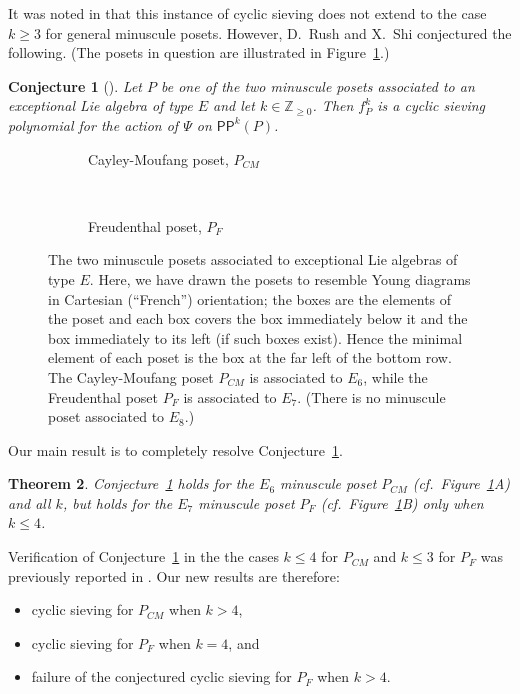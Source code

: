 \documentclass[12pt]{amsart}
\newtheorem{theorem}{Theorem}[section]
\newtheorem{conjecture}[theorem]{Conjecture}
\theoremstyle{definition}
\theoremstyle{remark}
\numberwithin{equation}{section}
\newcommand{\pp}{\ensuremath{\mathsf{PP}}}
\begin{document}
It was noted in \cite{Rush.Shi} that this instance of cyclic sieving does not extend to the case $k\geq 3$ for general minuscule posets.
However, D.~Rush and X.~Shi conjectured the following. (The posets in question are illustrated in Figure~\ref{fig:min_poset_E}.)
\begin{conjecture}[{\cite[Conjecture~11.1]{Rush.Shi}}]\label{conj:rush.shi}
Let $P$ be one of the two minuscule posets associated to an exceptional Lie algebra of type $E$ and let $k \in \mathbb{Z}_{\geq 0}$. Then $f_P^k$ is a cyclic sieving polynomial for the action of $\Psi$ on $\pp^k(P)$.
\end{conjecture}

\begin{figure}[h]
	\begin{subfigure}[b]{0.35\textwidth}
		\centering
		\caption{Cayley-Moufang poset, $P_{CM}$}
	\end{subfigure} \\ \vspace{4mm}
	\begin{subfigure}[b]{0.35\textwidth}
		\centering
		\caption{Freudenthal poset, $P_F$}
	\end{subfigure}
\caption{The two minuscule posets associated to exceptional Lie algebras of type $E$. Here, we have drawn the posets to resemble Young diagrams in Cartesian (``French'') orientation; the boxes are the elements of the poset and each box covers the box immediately below it and the box immediately to its left (if such boxes exist). Hence the minimal element of each poset is the box at the far left of the bottom row.
 The Cayley-Moufang poset $P_{CM}$ is associated to $E_6$, while the Freudenthal poset $P_F$ is associated to $E_7$. (There is no minuscule poset associated to $E_8$.)}
\label{fig:min_poset_E}
\end{figure}

Our main result is to completely resolve Conjecture~\ref{conj:rush.shi}. 
\begin{theorem}\label{thm:exceptionals}
Conjecture~\ref{conj:rush.shi} holds for the $E_6$ minuscule poset $P_{CM}$ (cf.~Figure~\ref{fig:min_poset_E}A) and all $k$, but holds for the $E_7$ minuscule poset $P_F$ (cf.~Figure~\ref{fig:min_poset_E}B) only when $k \leq 4$. 
\end{theorem}  
Verification of Conjecture~\ref{conj:rush.shi} in the the cases $k \leq 4$ for $P_{CM}$ and $k \leq 3$ for $P_F$ was previously reported in \cite{Rush.Shi}. Our new results are therefore:
\begin{itemize}
\item cyclic sieving for $P_{CM}$ when $k > 4$,
\item cyclic sieving for $P_F$ when $k = 4$, and
\item failure of the conjectured cyclic sieving for $P_F$ when $k > 4$.
\end{itemize}
\end{document}
